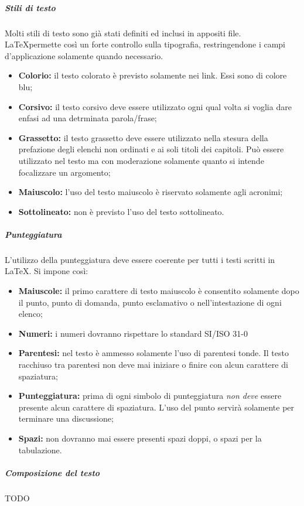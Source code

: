 				\subparagraph{Stili di testo}
				Molti stili di testo sono già stati definiti ed inclusi in appositi file. \LaTeX permette così un forte controllo sulla tipografia, restringendone i campi d'applicazione solamente quando necessario.  
				\begin{itemize}
				\item \textbf{Colorio:} il testo colorato è previsto solamente nei link. Essi sono di colore blu;
				\item \textbf{Corsivo:} il testo corsivo deve essere utilizzato ogni qual volta si voglia dare enfasi ad una detrminata parola/frase;
				\item \textbf{Grassetto:} il testo grassetto deve essere utilizzato nella stesura della prefazione degli elenchi non ordinati e ai soli titoli dei capitoli. Può essere utilizzato nel testo ma con moderazione solamente quanto si intende focalizzare un argomento;
				\item \textbf{Maiuscolo:} l'uso del testo maiuscolo è riservato solamente agli acronimi;
				\item \textbf{Sottolineato:} non è previsto l'uso del testo sottolineato.
				\end{itemize}

				\subparagraph{Punteggiatura}
				L'utilizzo della punteggiatura deve essere coerente per tutti i testi scritti in \LaTeX. Si impone così:
				\begin{itemize}
				\item \textbf{Maiuscole:} il primo carattere di testo maiuscolo è consentito solamente dopo il punto, punto di domanda, punto esclamativo o nell'intestazione di ogni elenco;
				\item \textbf{Numeri:} i numeri dovranno rispettare lo standard SI/ISO 31-0 
				\item \textbf{Parentesi:} nel testo è ammesso solamente l'uso di parentesi tonde. Il testo racchiuso tra parentesi non deve mai iniziare o finire con alcun carattere di spaziatura;
				\item \textbf{Punteggiatura:} prima di ogni simbolo di punteggiatura \emph{non deve} essere presente alcun carattere di spaziatura. L'uso del punto servirà solamente per terminare una discussione;
				\item \textbf{Spazi:} non dovranno mai essere presenti spazi doppi, o spazi per la tabulazione.
				\end{itemize}				
				
				\subparagraph{Composizione del testo}
				TODO
				
